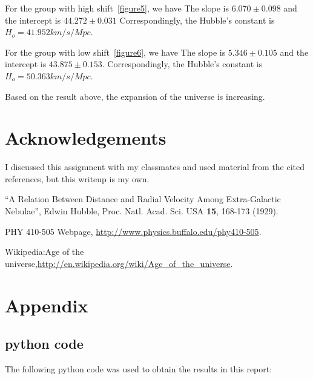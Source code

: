 \documentclass[11pt,letterpaper]{article}
\begin{document}
For the group with high shift~\ref{figure5}, we have The slope is $6.070\pm0.098$ and the intercept is $44.272\pm0.031$
Correspondingly, the Hubble's constant is $H_o=41.952km/s/Mpc$.

For the group with low shift~\ref{figure6}, we have The slope is $5.346\pm0.105$ and the intercept is $43.875\pm0.153$.
Correspondingly, the Hubble's constant is $H_o=50.363km/s/Mpc$.

Based on the result above, the expansion of the universe is increasing.


\newpage
\section*{Acknowledgements}

I discussed this assignment with my classmates and used material from the
cited references, but this writeup is my own.

\begin{thebibliography}{9}

``A Relation Between Distance and Radial Velocity Among Extra-Galactic Nebulae'',
Edwin Hubble, Proc. Natl. Acad. Sci. USA {\bf 15}, 168-173 (1929).

PHY 410-505 Webpage, \url{http://www.physics.buffalo.edu/phy410-505}.

Wikipedia:Age of the universe,\url{http://en.wikipedia.org/wiki/Age_of_the_universe}.

\end{thebibliography}

\newpage
\appendix
\section{Appendix}

\subsection{python code}

The following python code was used to obtain the results in this report:




\end{document}
